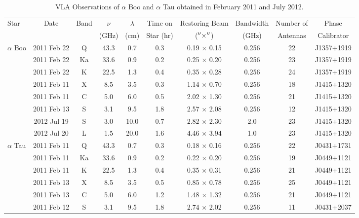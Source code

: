\begin{landscape}
\begin{table}
\begin{center}
\caption[VLA Observations of $\alpha$ Boo and $\alpha$ Tau.]
{VLA Observations of $\alpha$ Boo and $\alpha$ Tau obtained in February 2011 and July 2012.}
\begin{tabular}{lccccccccc}
\hline
\hline
\rule{0pt}{2.5ex}Star & Date & Band & $\nu$	& $\lambda$& Time on& Restoring Beam			& Bandwidth & Number of&Phase\\
	 & 		&  & (GHz)		& (cm)		& Star (hr)		  & ($^{\prime\prime} \times ^{\prime\prime}$)& (GHz)		& Antennas&Calibrator\\
\hline
\rule{0pt}{2.5ex} $\alpha$ Boo 	& 2011 Feb 22 & Q	& 43.3 & 0.7		& 0.3 	&0.19 $\times$ 0.15& 0.256	&22& J1357+1919  \\
				& 2011 Feb 22 & Ka	& 33.6 & 0.9		& 0.2 	&0.25 $\times$ 0.20& 0.256 	&23&J1357+1919  \\
				& 2011 Feb 22 & K	& 22.5 & 1.3		& 0.4	&0.35 $\times$ 0.28& 0.256 	&24&J1357+1919  \\
				& 2011 Feb 11 & X	& 8.5  & 3.5		& 0.3 	&1.14 $\times$ 0.70& 0.256 	&18&J1415+1320  \\
				& 2011 Feb 11 & C	& 5.0  & 6.0 		& 0.5	&2.02 $\times$ 1.30& 0.256 	&21& J1415+1320 \\
				& 2011 Feb 13 & S	& 3.1  & 9.5 		& 1.8 	&2.57 $\times$ 2.08& 0.256 	&12& J1415+1320 \\
				& 2012 Jul 19 & S	& 3.0  & 10.0 		& 0.7 	&2.82 $\times$ 2.30& 2.0		&23& J1415+1320 \\
				& 2012 Jul 20 & L	& 1.5  & 20.0		& 1.6 	&4.46 $\times$ 3.94& 1.0		&23& J1415+1320 \\
\hline
\rule{0pt}{2.5ex}  $\alpha$ Tau	& 2011 Feb 11 & Q	& 43.3 & 0.7 		& 0.3 	&0.18 $\times$ 0.16& 0.256 	&22&  J0431+1731\\
				& 2011 Feb 11 & Ka	& 33.6 & 0.9 		& 0.2 	&0.22 $\times$ 0.20& 0.256 	&19&  J0449+1121\\
				& 2011 Feb 11 & K	& 22.5 & 1.3 		& 0.4 	&0.35 $\times$ 0.31& 0.256 	&21&  J0449+1121\\
				& 2011 Feb 13 & X	&  8.5 & 3.5 		& 0.5	&0.85 $\times$ 0.78& 0.256 	&25&  J0449+1121\\
				& 2011 Feb 13 & C	&  5.0 & 6.0 		& 1.2	&1.48 $\times$ 1.32& 0.256 	&21&  J0449+1121\\
				& 2011 Feb 12 & S	&  3.1 & 9.5 		& 1.8 	&2.74 $\times$ 2.02& 0.256 	&11&  J0431+2037\\ 
\hline
\end{tabular}
\label{tab:1}
\end{center}
\end{table}
\end{landscape}

